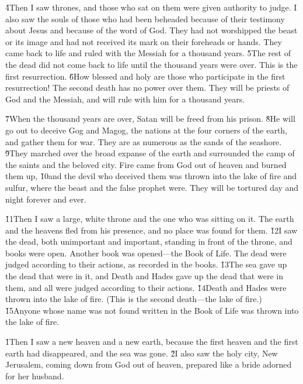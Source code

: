 \v{4}Then I saw thrones, and those who sat on them were given authority to judge. I also saw the souls of those who had been beheaded because of their testimony about Jesus and because of the word of God. They had not worshipped the beast or its image and had not received its mark on their foreheads or hands. They came back to life and ruled with the Messiah for a thousand years. \v{5}The rest of the dead did not come back to life until the thousand years were over. This is the first resurrection. \v{6}How blessed and holy are those who participate in the first resurrection! The second death has no power over them. They will be priests of God and the Messiah, and will rule with him for a thousand years.

\v{7}When the thousand years are over, Satan will be freed from his prison. \v{8}He will go out to deceive Gog and Magog, the nations at the four corners of the earth, and gather them for war. They are as numerous as the sands of the seashore. \v{9}They marched over the broad expanse of the earth and surrounded the camp of the saints and the beloved city. Fire came from God out of heaven and burned them up, \v{10}and the devil who deceived them was thrown into the lake of fire and sulfur, where the beast and the false prophet were. They will be tortured day and night forever and ever.

\v{11}Then I saw a large, white throne and the one who was sitting on it. The earth and the heavens fled from his presence, and no place was found for them. \v{12}I saw the dead, both unimportant and important, standing in front of the throne, and books were open. Another book was opened---the Book of Life. The dead were judged according to their actions, as recorded in the books. \v{13}The sea gave up the dead that were in it, and Death and Hades gave up the dead that were in them, and all were judged according to their actions. \v{14}Death and Hades were thrown into the lake of fire. (This is the second death---the lake of fire.) \v{15}Anyone whose name was not found written in the Book of Life was thrown into the lake of fire.

\v{1}Then I saw a new heaven and a new earth, because the first heaven and the first earth had disappeared, and the sea was gone. \v{2}I also saw the holy city, New Jerusalem, coming down from God out of heaven, prepared like a bride adorned for her husband.

